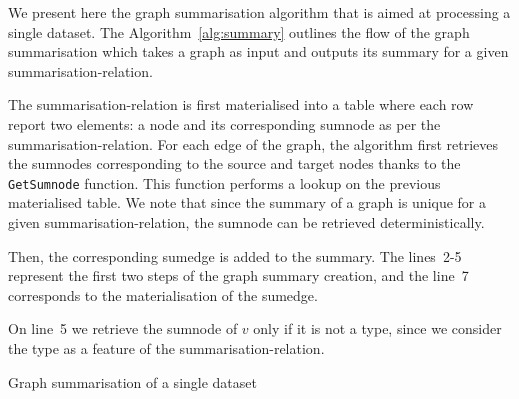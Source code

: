 We present here the graph summarisation algorithm that is aimed at processing a single dataset.
The Algorithm~\ref{alg:summary} outlines the flow of the graph summarisation which takes a graph as input and outputs its summary for a given \gls{summarisation-relation}.

The \gls{summarisation-relation} is first materialised into a table where each row report two elements: a node and its corresponding sumnode as per the \gls{summarisation-relation}.
For each edge of the graph, the algorithm first retrieves the sumnodes corresponding to the source and target nodes thanks to the \texttt{GetSumnode} function. This function performs a lookup on the previous materialised table. We note that since the summary of a graph is unique for a given \gls{summarisation-relation}, the sumnode can be retrieved deterministically.

Then, the corresponding sumedge is added to the summary. The lines~2-5 represent the first two steps of the graph summary creation, and the line~7 corresponds to the materialisation of the sumedge.

\begin{remark}
On line~5 we retrieve the sumnode of $v$ only if it is not a type, since we consider the type as a feature of the \gls{summarisation-relation}.
\end{remark}

%	

\begin{algorithm}
	\DontPrintSemicolon
	\BlankLine
	\caption{Graph summarisation of a single dataset}
	\label{alg:summary}
\end{algorithm}

